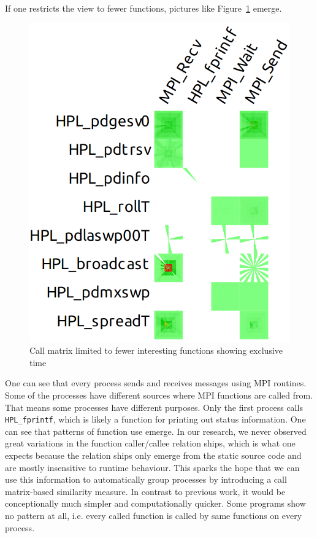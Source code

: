 \documentclass[b5paper, final, hauptseminar]{zih-template}
\begin{document}
If one restricts the view to fewer functions, pictures like Figure~\ref{fig:id-m-lp-2} emerge.
\begin{figure}[htbp]
	\centering
	\includegraphics[width=0.5\linewidth]{id-m-lp-2}
	\caption{Call matrix limited to fewer interesting functions showing exclusive time}
	\label{fig:id-m-lp-2}
\end{figure}
One can see that every process sends and receives messages using MPI routines.
Some of the processes have different sources where MPI functions are called from.
That means some processes have different purposes.
Only the first process calls \texttt{HPL\_fprintf}, which is likely a function for printing out status information.
One can see that patterns of function use emerge.
In our research, we never observed great variations in the function caller/callee relation ships, which is what one expects because the relation ships only emerge from the static source code and are mostly insensitive to runtime behaviour.
This sparks the hope that we can use this information to automatically group processes by introducing a call matrix-based similarity measure.
In contrast to previous work, it would be conceptionally much simpler and computationally quicker.
Some programs show no pattern at all, i.e. every called function is called by same functions on every process.
\end{document}
